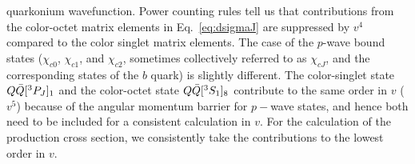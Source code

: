 \documentclass[aps,prc,preprint,superscriptaddress,showpacs,showkeys,amsmath]{revtex4-1}
\begin{document}
quarkonium wavefunction. 
Power counting rules tell us that contributions from the color-octet matrix
elements in Eq.~\ref{eq:dsigmaJ} are suppressed by $v^4$ compared to the color
singlet matrix elements.
The case of the $p$-wave bound states ($\chi_{c0}$, $\chi_{c1}$, and
$\chi_{c2}$, sometimes collectively referred to as $\chi_{cJ}$, 
and the corresponding states of the $b$ quark) 
is slightly different. 
The color-singlet state $Q{\bar{Q}}[^3P_J]_{1}$ and the color-octet state
$Q{\bar{Q}}[^3S_1]_{8}$ contribute to the same order in $v$ ($v^{5}$) because of the angular
momentum barrier for $p-$wave states, and hence both need to be included for a consistent
calculation in $v$.  For the calculation of the production cross section, we
consistently take the contributions to the lowest order in $v$.
\end{document}
